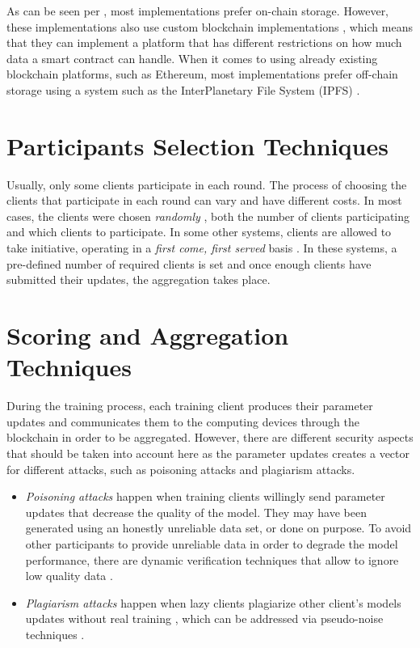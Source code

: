 As can be seen per , most implementations prefer on-chain storage. However, these implementations also use custom blockchain implementations \cite{8733825, 9524833, 8894364, 9184854, 8893114}, which means that they can implement a platform that has different restrictions on how much data a smart contract can handle. When it comes to using already existing blockchain platforms, such as Ethereum, most implementations prefer off-chain storage using a system such as the InterPlanetary File System (IPFS) \cite{10.48550/arxiv.2007.03856, 8945913, Peyvandi2022, 9170559, 10.1145/3319535.3363256, 10.48550/arxiv.2011.07516}.

\section{Participants Selection Techniques}\label{related_work:participants_selection}

Usually, only some clients participate in each round. The process of choosing the clients that participate in each round can vary and have different costs. In most cases, the clients were chosen \textit{randomly} \cite{Peyvandi2022, demo, 9293091}, both the number of clients participating and which clients to participate. In some other systems, clients are allowed to take initiative, operating in a \textit{first come, first served} basis \cite{9184854, FANG20221}. In these systems, a pre-defined number of required clients is set and once enough clients have submitted their updates, the aggregation takes place.

\section{Scoring and Aggregation Techniques}\label{related_work:scoring_techniques}

During the training process, each training client produces their parameter updates and communicates them to the computing devices through the blockchain in order to be aggregated. However, there are different security aspects that should be taken into account here as the parameter updates creates a vector for different attacks, such as poisoning attacks and plagiarism attacks.

\begin{itemize}
    \item \textit{Poisoning attacks} happen when training clients willingly send parameter updates that decrease the quality of the model. They may have been generated using an honestly unreliable data set, or done on purpose. To avoid other participants to provide unreliable data in order to degrade the model performance, there are dynamic verification techniques that allow to ignore low quality data \cite{10.48550/arxiv.2110.02182, 10.48550/arxiv.2104.10501}.
    
    \item \textit{Plagiarism attacks} happen when lazy clients plagiarize other client's models updates without real training \cite{9403374}, which can be addressed via pseudo-noise techniques \cite{10.48550/arxiv.2009.09338}.
\end{itemize}

